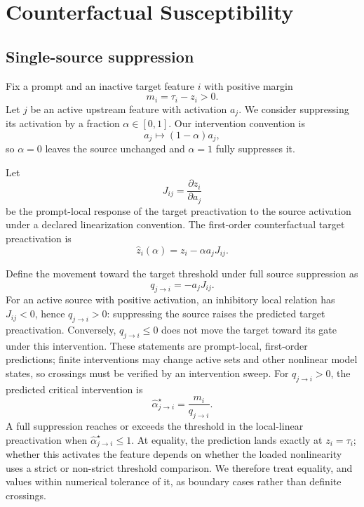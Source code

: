 \section{Counterfactual Susceptibility}
\label{sec:method}

\subsection{Single-source suppression}

Fix a prompt and an inactive target feature $i$ with positive margin
\begin{equation}
    m_i=\tau_i-z_i>0.
\end{equation}
Let $j$ be an active upstream feature with activation $a_j$. We consider suppressing its activation by a fraction $\alpha\in[0,1]$.
Our intervention convention is
\begin{equation}
    a_j \mapsto (1-\alpha)a_j,
\end{equation}
so $\alpha=0$ leaves the source unchanged and $\alpha=1$ fully suppresses it.

Let
\begin{equation}
    J_{ij}=\frac{\partial z_i}{\partial a_j}
\end{equation}
be the prompt-local response of the target preactivation to the source activation under a declared linearization convention. The first-order counterfactual target preactivation is
\begin{equation}
    \widehat z_i(\alpha)=z_i-\alpha a_jJ_{ij}.
\end{equation}

Define the movement toward the target threshold under full source suppression as
\begin{equation}
    q_{j\rightarrow i}=-a_jJ_{ij}.
\end{equation}
For an active source with positive activation, an inhibitory local relation has
$J_{ij}<0$, hence $q_{j\rightarrow i}>0$: suppressing the source raises the
predicted target preactivation. Conversely, $q_{j\rightarrow i}\leq 0$ does not
move the target toward its gate under this intervention. These statements are
prompt-local, first-order predictions; finite interventions may change active
sets and other nonlinear model states, so crossings must be verified by an
intervention sweep.
For $q_{j\rightarrow i}>0$, the predicted critical intervention is
\begin{equation}
    \widehat\alpha^\star_{j\rightarrow i}
    =\frac{m_i}{q_{j\rightarrow i}}.
\end{equation}
A full suppression reaches or exceeds the threshold in the local-linear
preactivation when $\widehat\alpha^\star_{j\rightarrow i}\leq 1$. At equality,
the prediction lands exactly at $z_i=\tau_i$; whether this activates the feature
depends on whether the loaded nonlinearity uses a strict or non-strict threshold
comparison. We therefore treat equality, and values within numerical tolerance
of it, as boundary cases rather than definite crossings.

